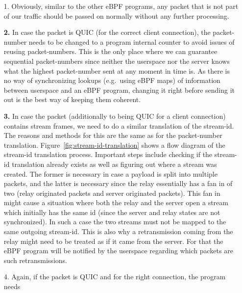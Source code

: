 \begin{enumerate}
    \item[1.]   Obviously, similar to the other eBPF programs, any packet that is not part of our traffic 
            should be passed on normally without any further processing.
    \item[\textbf{2.}] In case the packet is QUIC (for the correct client connection), the packet-number 
            needs to be changed to a program internal counter to avoid issues of reusing packet-numbers. 
            This is the only place where we can guarantee sequential packet-numbers since neither 
            the userspace nor the server knows what the highest packet-number sent at any moment in time is. 
            As there is no way of synchronizing lookups (e.g.~using eBPF maps) of information between userspace 
            and an eBPF program, changing it right before sending it out is the best way of keeping them coherent. 
    \item[\textbf{3.}] In case the packet (additionally to being QUIC for a client connection) contains 
                        stream frames, we need to do a similar translation of the stream-id.
                        The reasons and methods for this are the same as for the packet-number translation.
                        Figure~\ref{fig:stream-id-translation} shows a flow diagram of the stream-id translation
                        process.
                        Important steps include checking if the stream-id translation already exists as well
                        as figuring out where a stream was created.
                        The former is necessary in case a payload is split into multiple packets, and the latter is 
                        necessary since the relay essentially has a fan in of two (relay originated packets and 
                        server originated packets).
                        This fan in might cause a situation where both the relay and the server open a stream which 
                        initially has the same id (since the server and relay states are not synchronized).
                        In such a case the two streams must not be mapped to the same outgoing stream-id.  
                        This is also why a retransmission coming from the relay might need to be treated as 
                        if it came from the server. For that the eBPF program will be notified by the userspace 
                        regarding which packets are such retransmissions.
    \item[4.] Again, if the packet is QUIC and for the right connection, the program needs 

\end{enumerate}
